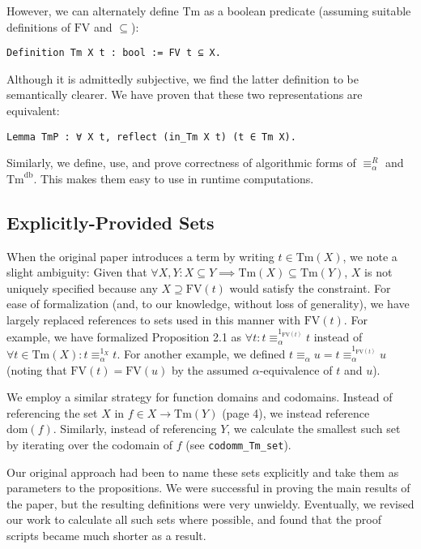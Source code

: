 \documentclass{article}
\begin{document}
However, we can alternately define $\textrm{Tm}$ as a boolean predicate (assuming suitable
definitions of $\textrm{FV}$ and $\subseteq$):

\begin{verbatim}
Definition Tm X t : bool := FV t ⊆ X.
\end{verbatim}

Although it is admittedly subjective, we find the latter definition to be semantically clearer. We
have proven that these two representations are equivalent:

\begin{verbatim}
Lemma TmP : ∀ X t, reflect (in_Tm X t) (t ∈ Tm X).
\end{verbatim}

Similarly, we define, use, and prove correctness of algorithmic forms of $\equiv_\alpha^R$ and
$\textrm{Tm}^{\textrm{db}}$. This makes them easy to use in runtime computations.

\subsection{Explicitly-Provided Sets}

When the original paper introduces a term by writing $t \in \textrm{Tm}(X)$, we note a slight ambiguity: Given
that $\forall X, Y : X \subseteq Y \implies \textrm{Tm}(X) \subseteq \textrm{Tm}(Y)$, $X$ is not
uniquely specified because any $X \supseteq \textrm{FV}(t)$ would satisfy the constraint. For ease of formalization
(and, to our knowledge, without loss of generality), we have largely replaced references to sets
used in this manner with $\textrm{FV}(t)$. For example, we have formalized Proposition 2.1 as $\forall t : t
\equiv_\alpha^{1_{\textrm{FV}(t)}} t$ instead of $\forall t \in \textrm{Tm}(X) : t
\equiv_\alpha^{1_X} t$. For another example, we defined $t \equiv_\alpha u = t
\equiv_\alpha^{1_{\textrm{FV}(t)}} u$ (noting that $\textrm{FV}(t) = \textrm{FV}(u)$ by the assumed
$\alpha$-equivalence of $t$ and $u$).

We employ a similar strategy for function domains and codomains. Instead of referencing the set $X$
in $f \in X \longrightarrow \textrm{Tm}(Y)$ (page 4), we instead reference $\textrm{dom}(f)$.
Similarly, instead of referencing $Y$, we calculate the smallest such set by iterating over
the codomain of $f$ (see \verb|codomm_Tm_set|).

Our original approach had been to name these sets explicitly and take them as parameters to the
propositions. We were successful in proving the main results of the paper, but the resulting
definitions were very unwieldy. Eventually, we revised our work to calculate all such sets where
possible, and found that the proof scripts became much shorter as a result.
\end{document}
